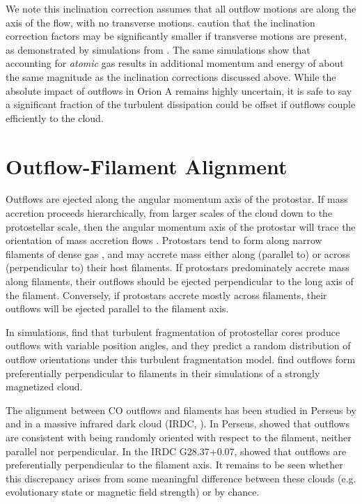 \documentclass[twocolumn]{aastex63}
\begin{document}
We note this inclination correction assumes that all outflow motions are along the axis of the flow, with no transverse motions. \citet{Dunham14} caution that the inclination correction factors may be significantly smaller if transverse motions are present, as demonstrated by simulations from \citet{Downes07}. The same simulations show that accounting for \emph{atomic} gas results in additional momentum and energy of about the same magnitude as the inclination corrections discussed above. While the absolute impact of outflows in Orion A remains highly uncertain, it is safe to say a significant fraction of the turbulent dissipation could be offset if outflows couple efficiently to the cloud. %

\section{Outflow-Filament Alignment}\label{sec:filaments}
Outflows are ejected along the angular momentum axis of the protostar. If mass accretion proceeds hierarchically, from larger scales of the cloud down to the protostellar scale, then the angular momentum axis of the protostar will trace the orientation of mass accretion flows \citep{Bodenheimer95}. Protostars tend to form along narrow filaments of dense gas \citep{Arzoumanian11}, and may accrete mass either along (parallel to) or across (perpendicular to) their host filaments. If protostars predominately accrete mass along filaments, their outflows should be ejected perpendicular to the long axis of the filament. Conversely, if protostars accrete mostly across filaments, their outflows will be ejected parallel to the filament axis. 

In simulations, \citet{Offner16} find that turbulent fragmentation of protostellar cores produce outflows with variable position angles, and they predict a random distribution of outflow orientations under this turbulent fragmentation model. \citet{Li18} find outflows form preferentially perpendicular to filaments in their simulations of a strongly magnetized cloud. 

The alignment between CO outflows and filaments has been studied in Perseus by \citet{Stephens17} and in a massive infrared dark cloud (IRDC, \citealp{Kong19}). In Perseus, \citet{Stephens17} showed that outflows are consistent with being randomly oriented with respect to the filament, neither parallel nor perpendicular. In the IRDC G28.37+0.07, \cite{Kong19} showed that outflows are preferentially perpendicular to the filament axis. It remains to be seen whether this discrepancy arises from some meaningful difference between these clouds (e.g. evolutionary state or magnetic field strength) or by chance. 
\end{document}
